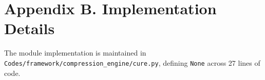 \section*{Appendix B. Implementation Details}
The module implementation is maintained in \texttt{Codes/framework/compression\_engine/cure.py}, defining \texttt{None} across 27 lines of code.
